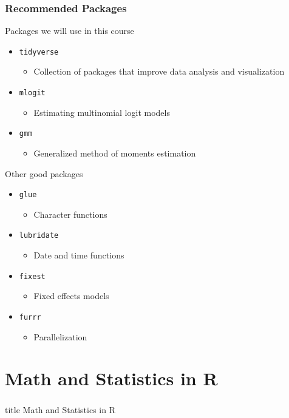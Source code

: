 \documentclass{beamer}\usepackage[]{graphicx}\usepackage[]{xcolor}
\begin{document}
\begin{frame}\frametitle{Recommended Packages}
    Packages we will use in this course
    \begin{itemize}
        \item \texttt{tidyverse}
        \begin{itemize}
            \item Collection of packages that improve data analysis and visualization
        \end{itemize}
        \item \texttt{mlogit}
        \begin{itemize}
            \item Estimating multinomial logit models
        \end{itemize}
        \item \texttt{gmm}
        \begin{itemize}
            \item Generalized method of moments estimation
        \end{itemize}
    \end{itemize}
    \vspace{0.5ex}
    Other good packages
    \begin{itemize}
        \item \texttt{glue}
        \begin{itemize}
            \item Character functions
        \end{itemize}
        \item \texttt{lubridate}
        \begin{itemize}
            \item Date and time functions
        \end{itemize}
        \item \texttt{fixest}
        \begin{itemize}
            \item Fixed effects models
        \end{itemize}
        \item \texttt{furrr}
        \begin{itemize}
            \item Parallelization
        \end{itemize}
    \end{itemize}
\end{frame}

\section{Math and Statistics in R}
\label{math}
\begin{frame}\frametitle{}
    \vfill
    \centering
    \begin{beamercolorbox}[center]{title}
        \Large Math and Statistics in R
    \end{beamercolorbox}
    \vfill
\end{frame}
\end{document}
